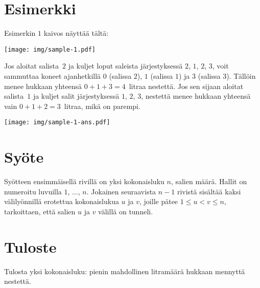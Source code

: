 \section*{Esimerkki}

Esimerkin $1$ kaivos näyttää tältä:

\texttt{[image: img/sample-1.pdf]}

Jos aloitat salista~$2$ ja kuljet loput saleista järjestyksessä $2$, $1$, $2$, $3$,
voit sammuttaa koneet ajanhetkillä $0$ (salissa $2$), $1$ (salissa $1$) ja $3$ (salissa $3$).
Tällöin menee hukkaan yhteensä $0+1+3=4$~litraa nestettä.
Jos sen sijaan aloitat salista~$1$ ja kuljet salit järjestyksessä $1$, $2$, $3$, nestettä menee hukkaan yhteensä vain $0+1+2=3$~litraa, mikä on parempi.

\texttt{[image: img/sample-1-ans.pdf]}

\section*{Syöte}

Syötteen ensimmäisellä rivillä on yksi kokonaisluku $n$, salien määrä.
Hallit on numeroitu luvuilla $1$, $\ldots$, $n$.
Jokainen seuraavista $n-1$ rivistä sisältää kaksi välilyönnillä erotettua kokonaislukua $u$ ja $v$, joille pätee
$1\leq u < v \leq n$, %
tarkoittaen, että salien $u$ ja $v$ välillä on tunneli.

\section*{Tuloste}

Tulosta yksi kokonaisluku: pienin mahdollinen litramäärä hukkaan mennyttä nestettä.

